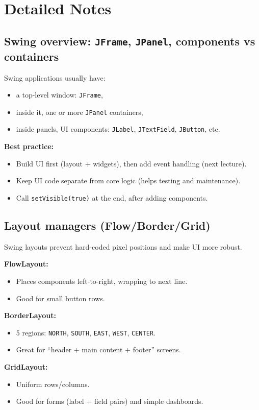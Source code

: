 \documentclass[11pt]{article}
\begin{document}
\section{Detailed Notes}
\subsection{Swing overview: \texttt{JFrame}, \texttt{JPanel}, components vs containers}
Swing applications usually have:
\begin{itemize}
  \item a top-level window: \texttt{JFrame},
  \item inside it, one or more \texttt{JPanel} containers,
  \item inside panels, UI components: \texttt{JLabel}, \texttt{JTextField}, \texttt{JButton}, etc.
\end{itemize}

\textbf{Best practice:}
\begin{itemize}
  \item Build UI first (layout + widgets), then add event handling (next lecture).
  \item Keep UI code separate from core logic (helps testing and maintenance).
  \item Call \texttt{setVisible(true)} at the end, after adding components.
\end{itemize}

\subsection{Layout managers (Flow/Border/Grid)}
Swing layouts prevent hard-coded pixel positions and make UI more robust.

\textbf{FlowLayout:}
\begin{itemize}
  \item Places components left-to-right, wrapping to next line.
  \item Good for small button rows.
\end{itemize}

\textbf{BorderLayout:}
\begin{itemize}
  \item 5 regions: \texttt{NORTH}, \texttt{SOUTH}, \texttt{EAST}, \texttt{WEST}, \texttt{CENTER}.
  \item Great for ``header + main content + footer'' screens.
\end{itemize}

\textbf{GridLayout:}
\begin{itemize}
  \item Uniform rows/columns.
  \item Good for forms (label + field pairs) and simple dashboards.
\end{itemize}
\end{document}
